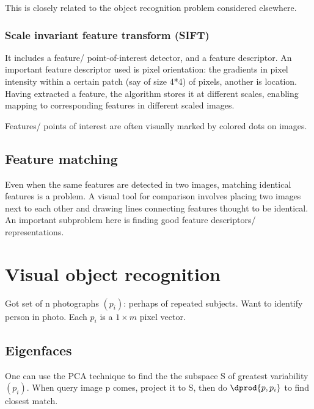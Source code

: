\documentclass[oneside, article]{memoir}
\begin{document}
This is closely related to the object recognition problem considered elsewhere.

\subsubsection{Scale invariant feature transform (SIFT)}
It includes a feature/ point-of-interest detector, and a feature descriptor. An important feature descriptor used is pixel orientation: the gradients in pixel intensity within a certain patch (say of size 4*4) of pixels, another is location. Having extracted a feature, the algorithm stores it at different scales, enabling mapping to corresponding features in different scaled images.

Features/ points of interest are often visually marked by colored dots on images.

\subsection{Feature matching}
Even when the same features are detected in two images, matching identical features is a problem. A visual tool for comparison involves placing two images next to each other and drawing lines connecting features thought to be identical. An important subproblem here is finding good feature descriptors/ representations.

\section{Visual object recognition}
Got set of n photographs $(p_{i})$: perhaps of repeated subjects. Want to identify person in photo. Each $p_{i}$ is a $1\times m$ pixel vector.

\subsection{Eigenfaces}
One can use the PCA technique to find the the subspace S of greatest variability $(p_{i})$. When query image p comes, project it to S, then do $\dprod{p, p_{i}}$ to find closest match.



\end{document}
